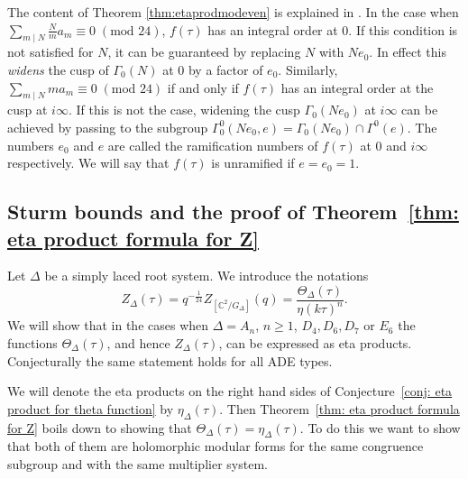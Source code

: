 \documentclass{article}
\theoremstyle{definition}
\newtheorem{example}[theorem]{Example}
\newcommand{\CC} {{\mathbb C}}          %
\begin{document}

The content of Theorem \ref{thm:etaprodmodeven} is explained in \cite[Section 1]{gordon1989multiplicative}. 
In the case when $\sum_{m \mid N} \frac{N}{m}a_m \equiv 0 \;(\textrm{mod }24)$, $f(\tau)$ has an integral order at 0. If this condition is not satisfied for $N$, it can be guaranteed by replacing $N$ with $Ne_0$. In effect this \emph{widens} the cusp of $\Gamma_0(N)$ at 0 by a factor of $e_0$. Similarly,  $\sum_{m \mid N} ma_m \equiv 0 \;(\textrm{mod }24)$ if and only if $f(\tau)$ has an integral order at the cusp at $i\infty$. If this is not the case, widening the cusp $\Gamma_0(Ne_0)$ at $i\infty$ can be achieved by passing to the subgroup $\Gamma_0^0(Ne_0,e)=\Gamma_0(Ne_0) \cap \Gamma^0(e)$. The numbers $e_0$ and $e$ are called the ramification numbers of $f(\tau)$ at $0$ and $i\infty$ respectively. We will say that $f(\tau)$ is unramified if $e=e_0=1$.





\subsection{Sturm bounds and the proof of Theorem~\ref{thm: eta product formula for Z}}

Let $\Delta$ be a simply laced root system. We introduce the notations
\[ Z_{\Delta}(\tau)=q^{-\frac{1}{24}}Z_{[\CC^2/G_\Delta]}(q)=\frac{\Theta_{\Delta}(\tau)}{\eta(k\tau)^n}.  \]
We will show that in the cases when $\Delta=A_n$, $n\geq 1$, $D_4, D_6, D_7$ or $E_6$ the functions $\Theta_{\Delta}(\tau)$, and hence $Z_{\Delta}(\tau)$, can be expressed as eta products. Conjecturally the same statement holds for all ADE types.


We will denote the eta products on the right hand sides of Conjecture~\ref{conj: eta product for theta function} by $\eta_{\Delta}(\tau)$. Then Theorem~\ref{thm: eta product formula for Z} boils down to showing that $\Theta_{\Delta}(\tau)=\eta_{\Delta}(\tau)$. To do this we want to show that both of them are holomorphic modular forms for the same congruence subgroup and with the same multiplier system.
\end{document}
